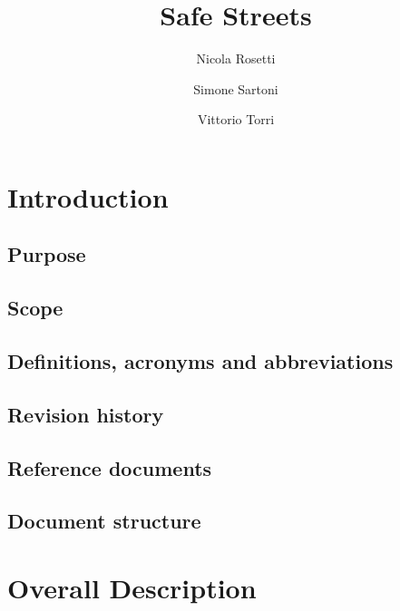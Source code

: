 \documentclass[a4paper]{report}
\begin{document}
\titleformat{\chapter}[hang] 
{\normalfont\huge\bfseries}{\thechapter}{1em}{} 

\author{Nicola Rosetti \and Simone Sartoni \and Vittorio Torri}
\title{Safe Streets}
\date{}
\maketitle

\tableofcontents

\chapter{Introduction}
\lipsum[1]
\section{Purpose}
\lipsum[1]
\section{Scope}
\lipsum[1]
\section{Definitions, acronyms and abbreviations}
\lipsum[1]
\section{Revision history}
\lipsum[1]
\section{Reference documents}
\lipsum[1]
\section{Document structure}
\lipsum[1]

\chapter{Overall Description}
\lipsum[1]
\end{document}

